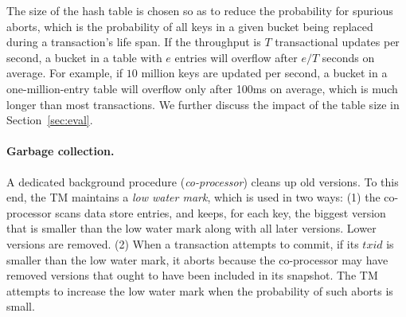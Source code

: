 The size of the hash table is chosen so as to reduce the probability for spurious aborts, which is the probability of  all keys in a given bucket being replaced during a transaction's life span. 
If the throughput is $T$ transactional updates per second, a bucket in a table with $e$ entries will overflow after $e/T$ seconds on average. For example, if $10$ million keys are updated per second, 
a bucket in a one-million-entry table will overflow only after 100ms on average, which is much longer than most transactions. We further discuss the impact of the table size in Section~\ref{sec:eval}. 

\paragraph{Garbage collection.} A dedicated background procedure ({\em co-processor}) cleans up old versions. To this end, the TM maintains 
a \emph{low water mark}, which is used in two ways: (1) the co-processor scans data store entries, and keeps, for each key,
the biggest version that is smaller than the low water mark along with all later versions. Lower versions are removed.
(2) When a transaction attempts to commit, if its $txid$ is smaller than the low water mark, it aborts because the co-processor may 
have removed versions that ought to have been included in its snapshot. 
The TM attempts to increase the low water mark when the probability of such aborts is small.


